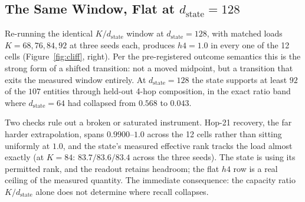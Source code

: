 \subsection{The Same Window, Flat at $d_{\mathrm{state}}=128$}
\label{sec:act2}

Re-running the identical $K/d_{\mathrm{state}}$ window at
$d_{\mathrm{state}}=128$, with matched loads $K = 68, 76, 84, 92$ at three
seeds each, produces $h4 = 1.0$ in every one of the 12 cells
(Figure~\ref{fig:cliff}, right). %
Per the pre-registered outcome semantics this is the strong form of a
shifted transition: not a moved midpoint, but a transition that exits the
measured window entirely. At $d_{\mathrm{state}}=128$ the state supports
at least $92$ of the $107$ entities through held-out 4-hop composition,
in the exact ratio band where $d_{\mathrm{state}}=64$ had collapsed from
$0.568$ to $0.043$. %

Two checks rule out a broken or saturated instrument. Hop-21 recovery,
the far harder extrapolation, spans $0.9900$--$1.0$ across the 12 cells
rather than sitting uniformly at $1.0$, %
and the state's measured effective rank tracks the load almost exactly
(at $K{=}84$: $83.7/83.6/83.4$ across the three seeds). %
The state is using its permitted rank, and the readout retains headroom;
the flat $h4$ row is a real ceiling of the measured quantity. The
immediate consequence: the capacity ratio $K/d_{\mathrm{state}}$ alone
does not determine where recall collapses.
